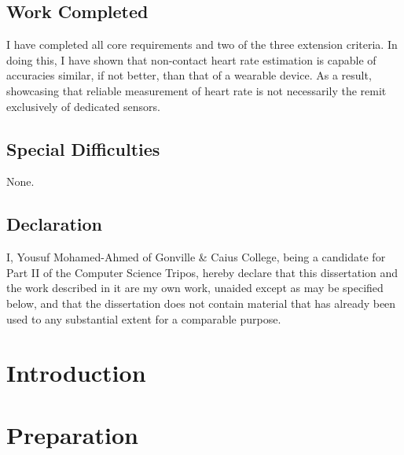\documentclass[12pt,twoside,notitlepage]{report}
\begin{document}
\section*{Work Completed}
I have completed all core requirements and two of the three extension criteria. In doing this, I have shown that 
non-contact heart rate estimation is capable of accuracies similar, if not better, than that of a wearable device. 
As a result, showcasing that reliable measurement of heart rate is not necessarily the remit exclusively of dedicated sensors.

\section*{Special Difficulties}
None.
 
\newpage
\section*{Declaration}

I, Yousuf Mohamed-Ahmed of Gonville \& Caius College, being a candidate for Part II of the Computer
Science Tripos, hereby declare
that this dissertation and the work described in it are my own work,
unaided except as may be specified below, and that the dissertation
does not contain material that has already been used to any substantial
extent for a comparable purpose.

\bigskip
{}

\medskip
{}

\cleardoublepage

\tableofcontents

\newpage


\cleardoublepage        %

\setcounter{page}{1}
\pagestyle{headings}

\chapter{Introduction}

\cleardoublepage

\chapter{Preparation}

\cleardoublepage
\end{document}
